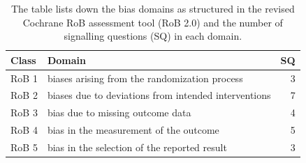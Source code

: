 \documentclass[sn-mathphys,Numbered]{sn-jnl}%
\theoremstyle{thmstyleone}%
\theoremstyle{thmstyletwo}%
\theoremstyle{thmstylethree}%
\begin{document}
%
%
%
\begin{table}
 \centering
   \caption{The table lists down the bias domains as structured in the revised Cochrane RoB assessment tool (RoB 2.0) and the number of signalling questions (SQ) in each domain.}\label{tab1}
    \begin{tabular}{|l|l|r|}
    \hline
     Class & Domain & SQ\\
    \hline
    \hline
    RoB 1 & biases arising from the randomization process &  3\\
    RoB 2 & biases due to deviations from intended interventions & 7\\
    RoB 3 & bias due to missing outcome data & 4\\
    RoB 4 & bias in the measurement of the outcome & 5\\
    RoB 5 & bias in the selection of the reported result & 3\\
    \hline
    \end{tabular}
\end{table}
%
%
%
\end{document}
